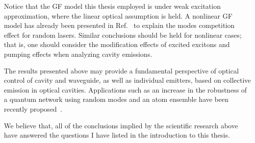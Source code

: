 Notice that the GF model this thesis employed is under weak excitation approximation, where the linear optical assumption is held. A nonlinear GF model has already been presented in Ref.~ to explain the modes competition effect for random lasers. Similar conclusions should be held for nonlinear cases; that is, one should consider the modification effects of excited excitons and pumping effects when analyzing cavity emissions.

The results presented above may provide a fundamental perspective of optical control of cavity and waveguide, as well as individual emitters, based on collective emission in optical cavities. Applications such as an increase in the robustness of a quantum network using random modes and an atom ensemble have been recently proposed~\cite{sapienza2010cavity,wiersma2010random}.

We believe that, all of the conclusions implied by the scientific research above have answered the questions I have listed in the introduction to this thesis.







